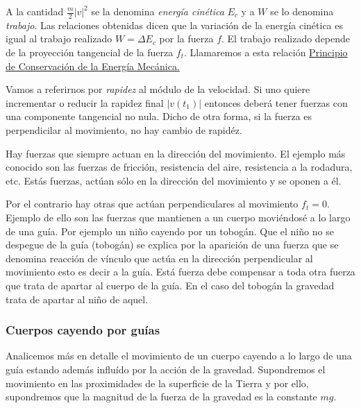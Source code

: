   A la cantidad $\frac{m}{2}|v|^2$ se la denomina \emph{energía cinética} $E_c$ y a $W$ se lo denomina \emph{trabajo}.
Las relaciones obtenidas dicen que la variación de la energía cinética es igual al trabajo realizado $W=\Delta E_c$ por la fuerza $f$.
El trabajo realizado depende de la proyección tangencial de la fuerza $f_t$.  Llamaremos a esta relación
\href{https://es.wikipedia.org/wiki/Conservaci%C3%B3n_de_la_energ%C3%ADa}{Principio de Conservación de la Energía Mecánica.}\link

  Vamos a referirnos por \emph{rapidez} al módulo de la velocidad.
Si uno quiere incrementar o reducir la rapidez final $|v(t_1)|$ entonces deberá tener fuerzas con una componente tangencial no nula. 
Dicho de otra forma, si la fuerza es perpendicilar al movimiento, no hay cambio de rapidéz. 

  Hay fuerzas que siempre actuan en la dirección del movimiento. El ejemplo más conocido son las fuerzas de fricción, resistencia del aire,
resistencia a la rodadura, etc. Estás fuerzas, actúan sólo en la dirección del movimiento y se oponen a él.


 

  Por el contrario hay otras que actúan perpendiculares al movimiento $f_t=0$. Ejemplo de ello son las fuerzas que mantienen a un cuerpo moviéndosé a lo largo
de una guía. Por ejemplo un niño cayendo por un tobogán. Que el niño no se despegue de la guía (tobogán) se explica por la aparición de una fuerza que se denomina
reacción de vínculo que actúa en la dirección perpendicular al movimiento esto es decir a la guía. Está fuerza debe compensar a toda otra fuerza que trata de apartar
al cuerpo de la guía.  En el caso del tobogán la gravedad trata de apartar al niño de aquel.





\subsubsection{Cuerpos cayendo por guías}
Analicemos más en detalle el movimiento de un cuerpo cayendo a lo largo de una guía estando además influído  por la acción de la gravedad. Supondremos el movimiento en las proximidades de la superficie de la Tierra y por ello, supondremos que la magnitud de la fuerza de la gravedad es la constante $mg$.





